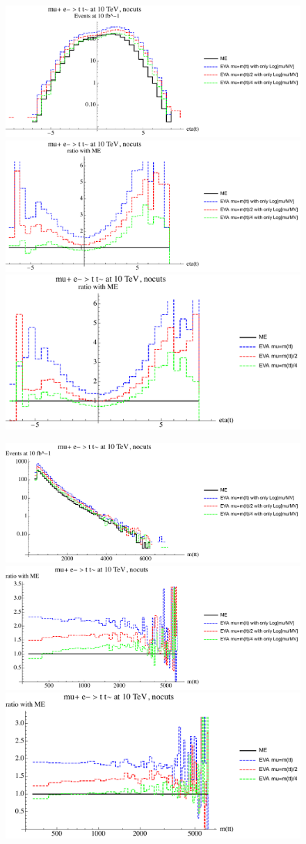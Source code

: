 \documentclass[a4paper,11pt]{article}
\begin{document}
\begin{figure}[ht]
\includegraphics[width=0.46\linewidth]{PlotDistr/WW_tt/10TeVnocuts/plotetat.pdf}
\includegraphics[width=0.46\linewidth]{PlotDistr/WW_tt/10TeVnocuts/plotetatratio1.pdf}
\includegraphics[width=0.46\linewidth]{PlotDistr/WW_tt/10TeVnocuts/plotetatratio2.pdf}
\end{figure}

\begin{figure}[ht]
\includegraphics[width=0.46\linewidth]{PlotDistr/WW_tt/10TeVnocuts/plotmtt.pdf}
\includegraphics[width=0.46\linewidth]{PlotDistr/WW_tt/10TeVnocuts/plotmttratio1.pdf}
\includegraphics[width=0.46\linewidth]{PlotDistr/WW_tt/10TeVnocuts/plotmttratio2.pdf}
\end{figure}
\end{document}
